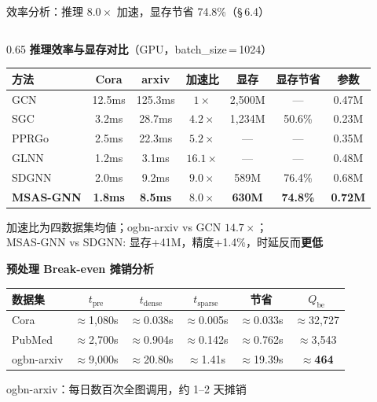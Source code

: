 \documentclass[aspectratio=169,9pt,xcolor=dvipsnames]{beamer}
\newcommand{\highlight}[1]{\textcolor{myred}{\textbf{#1}}}
\newcommand{\blue}[1]{\textcolor{mynavy}{#1}}
\newcommand{\green}[1]{\textcolor{mygreen}{#1}}
\begin{document}
\begin{frame}{效率分析：推理 $8.0\times$ 加速，显存节省 74.8\%（§\,6.4）}
\begin{columns}[T]

\begin{column}{0.65\textwidth}
  \textbf{\blue{推理效率与显存对比}}（GPU，batch\_size\,=\,1024）
   {\small
  \medskip
  \begin{tabular}{lcccccc}
    \toprule
    方法 & Cora & arxiv & 加速比 & 显存 & 显存节省 & 参数 \\
    \midrule
    GCN & 12.5ms & 125.3ms & $1\times$ & 2,500M & — & 0.47M \\
    SGC & 3.2ms & 28.7ms & $4.2\times$ & 1,234M & 50.6\% & 0.23M \\
    PPRGo & 2.5ms & 22.3ms & $5.2\times$ & — & — & 0.35M \\
    GLNN & 1.2ms & 3.1ms & $16.1\times$ & — & — & 0.48M \\
    SDGNN & 2.0ms & 9.2ms & $9.0\times$ & 589M & 76.4\% & 0.68M \\
    \textbf{MSAS-GNN} & \textbf{1.8ms} & \textbf{8.5ms} & $\boldsymbol{8.0\times}$ & \textbf{630M} & \textbf{74.8\%} & \textbf{0.72M} \\
    \bottomrule
  \end{tabular}
   }
  \medskip
   加速比为四数据集均値；ogbn-arxiv vs GCN \highlight{$14.7\times$}；\\MSAS-GNN vs SDGNN: 显存+41M，精度\green{+1.4\%}，时延反而\textbf{更低}

  \medskip
  \textbf{\blue{预处理 Break-even 摊销分析}}

  \medskip
  {
  \begin{tabular}{lccccc}
    \toprule
    数据集 & $t_{\mathrm{pre}}$ & $t_{\mathrm{dense}}$ & $t_{\mathrm{sparse}}$ & 节省 & $Q_{\mathrm{be}}$ \\
    \midrule
    Cora & $\approx$1,080s & $\approx$0.038s & $\approx$0.005s & $\approx$0.033s & $\approx$32,727 \\
    PubMed & $\approx$2,700s & $\approx$0.904s & $\approx$0.142s & $\approx$0.762s & $\approx$3,543 \\
    ogbn-arxiv & $\approx$9,000s & $\approx$20.80s & $\approx$1.41s & $\approx$19.39s & \highlight{$\approx$464} \\
    \bottomrule
  \end{tabular}
  }
  \medskip
  ogbn-arxiv：每日数百次全图调用，约 1--2 天摊销
\end{column}


\end{columns}
\end{frame}
\end{document}
